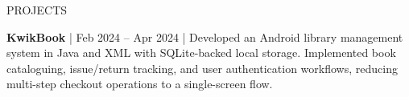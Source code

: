 \documentclass{resume}
\begin{document}
\vspace{-0.4em}
\begin{rSection}{PROJECTS}
\vspace{-1.25em}
\item \textbf{KwikBook} | Feb 2024 – Apr 2024 |
Developed an Android library management system in Java and XML with SQLite-backed local storage. Implemented book cataloguing, issue/return tracking, and user authentication workflows, reducing multi-step checkout operations to a single-screen flow.  \href{https://github.com/AdityaTirumalasetty/KwikBook}{\faGithub}






\end{rSection} 
\end{document}
